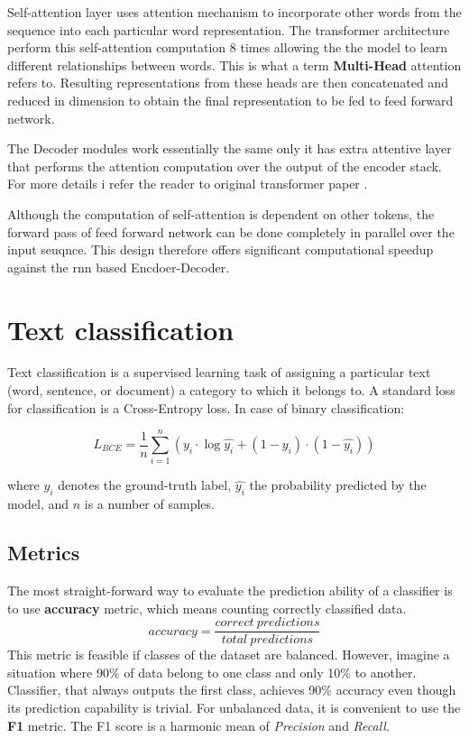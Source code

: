 Self-attention layer uses attention mechanism to incorporate other words from the sequence into each particular word representation. The transformer architecture perform this self-attention computation 8 times allowing the the model to learn different relationships between words. This is what a term \textbf{Multi-Head} attention refers to. Resulting representations from these heads are then concatenated and reduced in dimension to obtain the final representation to be fed to feed forward network. 

The Decoder modules work essentially the same only it has extra attentive layer that performs the attention computation over the output of the encoder stack. For more details i refer the reader to original transformer paper \cite{vaswani2017attention}.

Although the computation of self-attention is dependent on other tokens, the forward pass of feed forward network can be done completely in parallel over the input seuqnce. This design therefore offers significant computational speedup against the \gls{rnn} based Encdoer-Decoder.




\section{Text classification}
Text classification is a supervised learning task of assigning a particular text (word, sentence, or document) a category to which it belongs to. A standard loss for classification is a Cross-Entropy loss. In case of binary classification:

\begin{equation}
    L_{BCE} = \frac{1}{n} \sum_{i=1}^n ( y_i \cdot \log\hat{y_i} + (1-y_i)\cdot(1-\hat{y_i}))
\end{equation}

where $y_i$ denotes the ground-truth label, $\hat{y_i}$ the probability predicted by the model, and $n$ is a number of samples.


    
\subsection{Metrics}
The most straight-forward way to evaluate the prediction ability of a classifier is to use \textbf{accuracy} metric, which means counting correctly classified  data. 
\begin{equation}
    accuracy = \frac{correct\ predictions}{total\ predictions}
\end{equation}
This metric is feasible if classes of the dataset are balanced. However, imagine a situation where 90\% of data belong to one class and only 10\% to another. Classifier, that always outputs the first class, achieves 90\% accuracy even though its prediction capability is trivial. For unbalanced data, it is convenient to use the \textbf{F1} metric. The F1 score is a harmonic mean of \textit{Precision} and \textit{Recall}.

